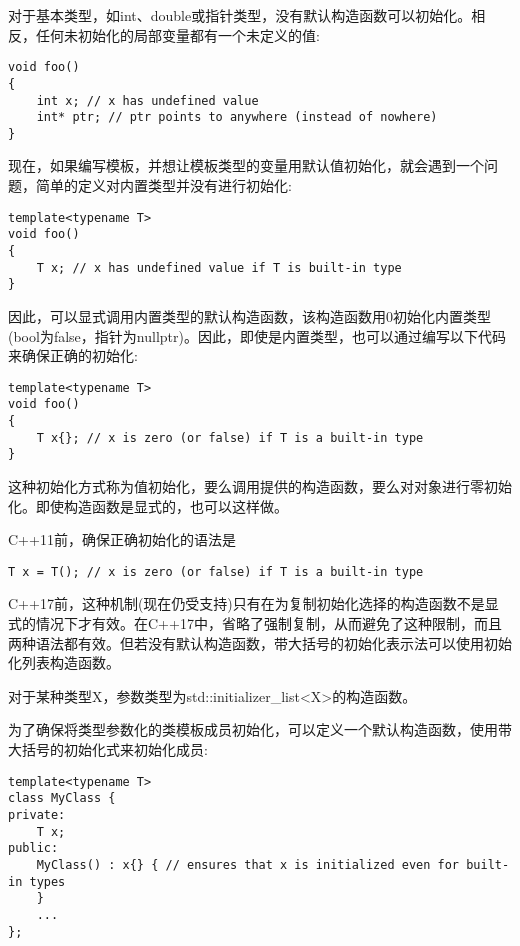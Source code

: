 对于基本类型，如int、double或指针类型，没有默认构造函数可以初始化。相反，任何未初始化的局部变量都有一个未定义的值:

\begin{lstlisting}[style=styleCXX]
void foo()
{
	int x; // x has undefined value
	int* ptr; // ptr points to anywhere (instead of nowhere)
}
\end{lstlisting}

现在，如果编写模板，并想让模板类型的变量用默认值初始化，就会遇到一个问题，简单的定义对内置类型并没有进行初始化:

\begin{lstlisting}[style=styleCXX]
template<typename T>
void foo()
{
	T x; // x has undefined value if T is built-in type
}
\end{lstlisting}

因此，可以显式调用内置类型的默认构造函数，该构造函数用0初始化内置类型(bool为false，指针为nullptr)。因此，即使是内置类型，也可以通过编写以下代码来确保正确的初始化:

\begin{lstlisting}[style=styleCXX]
template<typename T>
void foo()
{
	T x{}; // x is zero (or false) if T is a built-in type
}
\end{lstlisting}

这种初始化方式称为值初始化，要么调用提供的构造函数，要么对对象进行零初始化。即使构造函数是显式的，也可以这样做。

C++11前，确保正确初始化的语法是

\begin{lstlisting}[style=styleCXX]
T x = T(); // x is zero (or false) if T is a built-in type
\end{lstlisting}

C++17前，这种机制(现在仍受支持)只有在为复制初始化选择的构造函数不是显式的情况下才有效。在C++17中，省略了强制复制，从而避免了这种限制，而且两种语法都有效。但若没有默认构造函数，带大括号的初始化表示法可以使用初始化列表构造函数。

\begin{tcolorbox}[colback=webgreen!5!white,colframe=webgreen!75!black]
\hspace*{0.75cm}对于某种类型X，参数类型为std::initializer\_list<X>的构造函数。
\end{tcolorbox}

为了确保将类型参数化的类模板成员初始化，可以定义一个默认构造函数，使用带大括号的初始化式来初始化成员:

\begin{lstlisting}[style=styleCXX]
template<typename T>
class MyClass {
private:
	T x;
public:
	MyClass() : x{} { // ensures that x is initialized even for built-in types
	}
	...
};
\end{lstlisting}

